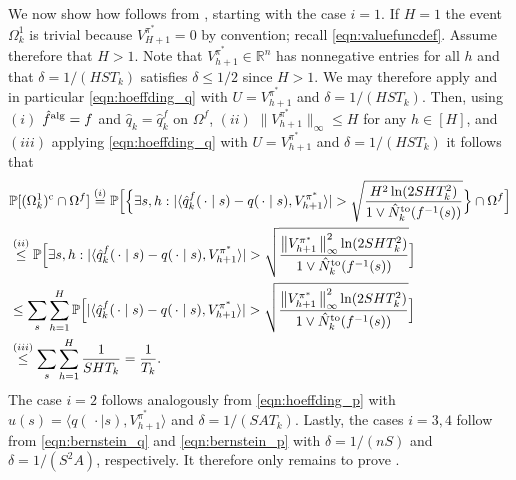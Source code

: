 \documentclass[11pt]{article}
\newcommand{\mbbR}{\mathbb{R}}
\newcommand{\norm}[1]{\left\lVert#1\,\right\rVert}
\newcommand{\alg}{\textnormal{alg}}
\theoremstyle{definition}
\theoremstyle{definition}
\begin{document}
We now show how  follows from , starting with the case $i=1$.
If $H=1$ the event $\Omega_k^1$ is trivial because $V_{H+1}^{\pi^*}=0$ by convention; recall \eqref{eqn:valuefuncdef}.
Assume therefore that $H>1$.
Note that $V_{h+1}^{\pi^*}\in\mbbR^n$ has nonnegative entries for all $h$ and that $\delta=1/(HST_k)$ satisfies $\delta\leq 1/2$ since $H>1$.
We may therefore apply  and in particular \eqref{eqn:hoeffding_q} with $U=V_{h+1}^{\pi^*}$ and $\delta=1/(HST_k)$.
Then, using $(i)$ $\hat{f}^{\alg} = f$ and $\hat{q}_k=\hat{q}_k^f$ on $\Omega^f$, $(ii)$ $\lVert V_{h+1}^{\pi^*}\rVert_{\infty}\leq H$ for any $h\in[H]$, and $(iii)$ applying \eqref{eqn:hoeffding_q} with $U=V_{h+1}^{\pi^*}$ and $\delta = 1/(HST_k)$ it follows that
\begin{align}
	 &
	\mathbb{P}[(\Omega_k^1)^{\mathrm{c}}\cap\Omega^f]
	\overset{(i)}{=}
	\mathbb{P}\Bigl[
	\Bigl\{
	\exists s,h: |\langle \hat{q}^f_k(\,\cdot \mid s)-q(\,\cdot \mid s), V^{\pi^*}_{h+1}\rangle|>\sqrt{\frac{H^2\ln(2SHT_k^2)}{1\vee\hat{N}^{\mathrm{to}}_k(f^{-1}(s))}}
	\Bigr\}
	\cap \Omega^f
	\Bigr]
	\nonumber
	\\
	 &
	\overset{(ii)}{\leq}
	\mathbb{P}\Bigl[
	\exists s,h: |\langle \hat{q}^f_k(\,\cdot \mid s)-q(\,\cdot \mid s), V^{\pi^*}_{h+1}\rangle|>\sqrt{\frac{\norm{V^{\pi^*}_{h+1}}_{\infty}^2\ln(2SHT_k^2)}{1\vee\hat{N}^{\mathrm{to}}_k(f^{-1}(s))}}
	\Bigr]
	\\
	 &
	\leq
	\sum_{s}
	\sum_{h=1}^H
	\mathbb{P}\Bigl[
	|\langle \hat{q}^f_k(\,\cdot \mid s)-q(\,\cdot \mid s), V^{\pi^*}_{h+1}\rangle|>\sqrt{\frac{\norm{V^{\pi^*}_{h+1}}_{\infty}^2\ln(2SHT_k^2)}{1\vee\hat{N}^{\mathrm{to}}_k(f^{-1}(s))}}
	\Bigr]
	\nonumber
	\\
	 &
	\overset{(iii)}{\leq}
	\sum_{s}
	\sum_{h=1}^H
	\frac{1}{SHT_k}
	=
	\frac{1}{T_k}
	.
	\nonumber
\end{align}
The case $i=2$ follows analogously from \eqref{eqn:hoeffding_p} with $u(s)=\langle q(\,\cdot \mid s), V_{h+1}^{\pi^*}\rangle$ and $\delta=1/(SAT_k)$.
Lastly, the cases $i=3,4$ follow from \eqref{eqn:bernstein_q} and \eqref{eqn:bernstein_p} with $\delta=1/(nS)$ and $\delta=1/(S^2A)$, respectively.
It therefore only remains to prove .
\end{document}
